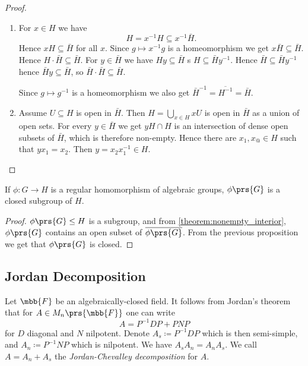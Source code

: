 \documentclass[10pt,a4paper,twoside,openany,hidelinks]{book}
\begin{document}
\begin{proof}
\begin{enumerate}
\item For $x \in H$ we have
\[H = x^{-1} H \subseteq x^{-1} \bar{H} \text{.}\]
Hence $xH \subseteq \bar{H}$ for all $x$. Since $g \mapsto x^{-1} g$ is a homeomorphism we get $x\bar{H} \subseteq \bar{H}$. Hence $H \cdot \bar{H} \subseteq \bar{H}$.
For $y \in \bar{H}$ we have $Hy \subseteq \bar{H}$ s $H \subseteq \bar{H} y^{-1}$. Hence $\bar{H} \subseteq \bar{H} y^{-1}$ hence $\bar{H} y \subseteq \bar{H}$, so $\bar{H} \cdot \bar{H} \subseteq \bar{H}$.

Since $g \mapsto g^{-1}$ is a homeomorphism we also get $\bar{H}^{-1} = \overline{H^{-1}} = \bar{H}$.

\item Assume $U \subseteq H$ is open in $\bar{H}$. Then $H = \bigcup_{x \in H} xU$ is open in $\bar{H}$ as a union of open sets. For every $y \in \bar{H}$ we get $yH \cap H$ is an intersection of dense open subsets of $\bar{H}$, which is therefore non-empty.
Hence there are $x_1, x_@ \in H$ such that $y x_1 = x_2$. Then $y = x_2 x_1^{-1} \in H$.
\end{enumerate}
\end{proof}

\begin{proposition}
If $\phi \colon G \to H$ is a regular homomorphism of algebraic groups, $\phi\prs{G}$ is a closed subgroup of $H$.
\end{proposition}

\begin{proof}
$\phi\prs{G} \leq H$ is a subgroup, and from \ref{theorem:nonempty_interior}, $\phi\prs{G}$ contains an open subset of $\overline{\phi\prs{G}}$. From the previous proposition we get that $\phi\prs{G}$ is closed.
\end{proof}

\subsection{Jordan Decomposition}

Let $\mbb{F}$ be an algebraically-closed field. It follows from Jordan's theorem that for $A \in M_n\prs{\mbb{F}}$ one can write
\[A = P^{-1} D P + PNP\]
for $D$ diagonal and $N$ nilpotent.
Denote $A_s \coloneqq P^{-1} D P$ which is then semi-simple, and $A_n \coloneqq P^{-1} N P$ which is nilpotent.
We have $A_s A_n = A_n A_s$.
We call $A = A_n + A_s$ the \emph{Jordan-Chevalley decomposition} for $A$.
\end{document}

